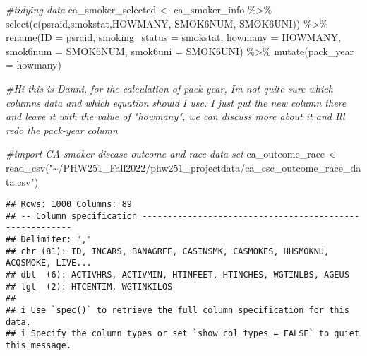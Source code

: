 \documentclass[
]{article}
\newenvironment{Shaded}{\begin{snugshade}}{\end{snugshade}}
\newcommand{\AttributeTok}[1]{\textcolor[rgb]{0.77,0.63,0.00}{#1}}
\newcommand{\CommentTok}[1]{\textcolor[rgb]{0.56,0.35,0.01}{\textit{#1}}}
\newcommand{\FunctionTok}[1]{\textcolor[rgb]{0.00,0.00,0.00}{#1}}
\newcommand{\NormalTok}[1]{#1}
\newcommand{\OtherTok}[1]{\textcolor[rgb]{0.56,0.35,0.01}{#1}}
\newcommand{\SpecialCharTok}[1]{\textcolor[rgb]{0.00,0.00,0.00}{#1}}
\newcommand{\StringTok}[1]{\textcolor[rgb]{0.31,0.60,0.02}{#1}}
\begin{document}
\begin{Shaded}
\begin{Highlighting}[]
\CommentTok{\#tidying data}
\NormalTok{ca\_smoker\_selected }\OtherTok{\textless{}{-}}\NormalTok{ ca\_smoker\_info }\SpecialCharTok{\%\textgreater{}\%} \FunctionTok{select}\NormalTok{(}\FunctionTok{c}\NormalTok{(psraid,smokstat,HOWMANY, SMOK6NUM, SMOK6UNI)) }\SpecialCharTok{\%\textgreater{}\%} 
\FunctionTok{rename}\NormalTok{(}\AttributeTok{ID =}\NormalTok{ psraid, }\AttributeTok{smoking\_status =}\NormalTok{ smokstat, }\AttributeTok{howmany =}\NormalTok{ HOWMANY, }\AttributeTok{smok6num =}\NormalTok{ SMOK6NUM, }\AttributeTok{smok6uni =}\NormalTok{ SMOK6UNI) }\SpecialCharTok{\%\textgreater{}\%}
\FunctionTok{mutate}\NormalTok{(}\AttributeTok{pack\_year =}\NormalTok{ howmany)}

\CommentTok{\#Hi this is Danni, for the calculation of pack{-}year, Im not quite sure which columns\textquotesingle{} data and which equation should I use. I just put the new column there and leave it with the value of "howmany", we can discuss more about it and I\textquotesingle{}ll redo the pack{-}year column}
\end{Highlighting}
\end{Shaded}

\newpage

\begin{Shaded}
\begin{Highlighting}[]
\CommentTok{\#import CA smoker disease outcome and race data set}
\NormalTok{ca\_outcome\_race }\OtherTok{\textless{}{-}} \FunctionTok{read\_csv}\NormalTok{(}\StringTok{"\textasciitilde{}/PHW251\_Fall2022/phw251\_projectdata/ca\_csc\_outcome\_race\_data.csv"}\NormalTok{)}
\end{Highlighting}
\end{Shaded}

\begin{verbatim}
## Rows: 1000 Columns: 89
## -- Column specification --------------------------------------------------------
## Delimiter: ","
## chr (81): ID, INCARS, BANAGREE, CASINSMK, CASMOKES, HHSMOKNU, ACQSMOKE, LIVE...
## dbl  (6): ACTIVHRS, ACTIVMIN, HTINFEET, HTINCHES, WGTINLBS, AGEUS
## lgl  (2): HTCENTIM, WGTINKILOS
## 
## i Use `spec()` to retrieve the full column specification for this data.
## i Specify the column types or set `show_col_types = FALSE` to quiet this message.
\end{verbatim}
\end{document}
